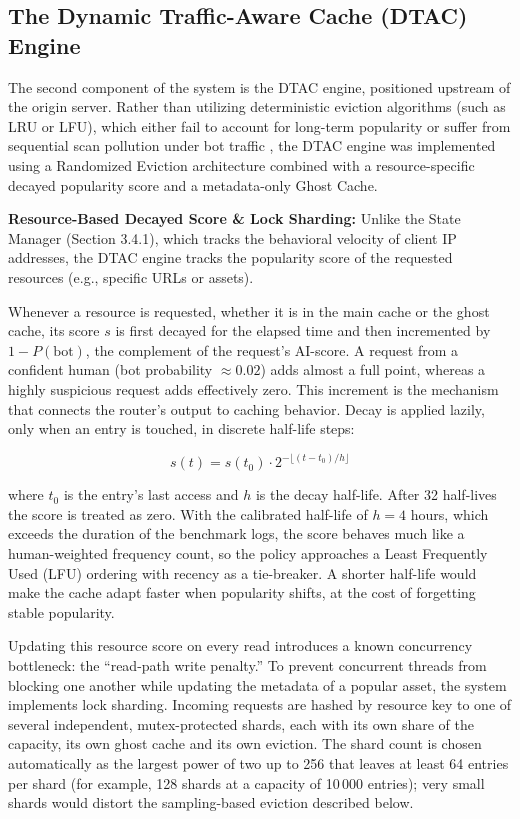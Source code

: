 \subsection{The Dynamic Traffic-Aware Cache (DTAC) Engine}
The second component of the system is the DTAC engine, positioned upstream of the origin server. Rather than utilizing deterministic eviction algorithms (such as LRU or LFU), which either fail to account for long-term popularity or suffer from sequential scan pollution under bot traffic \cite{zhang_rethinking_2026}, the DTAC engine was implemented using a Randomized Eviction architecture combined with a resource-specific decayed popularity score and a metadata-only Ghost Cache.

\textbf{Resource-Based Decayed Score \& Lock Sharding:}
Unlike the State Manager (Section 3.4.1), which tracks the behavioral velocity of client IP addresses, the DTAC engine tracks the popularity score of the requested resources (e.g., specific URLs or assets).

Whenever a resource is requested, whether it is in the main cache or the ghost cache, its score $s$ is first decayed for the elapsed time and then incremented by $1 - P(\text{bot})$, the complement of the request's AI-score. A request from a confident human (bot probability $\approx 0.02$) adds almost a full point, whereas a highly suspicious request adds effectively zero. This increment is the mechanism that connects the router's output to caching behavior. Decay is applied lazily, only when an entry is touched, in discrete half-life steps:

\begin{equation}
s(t) = s(t_0) \cdot 2^{-\lfloor (t - t_0) / h \rfloor}
\end{equation}

where $t_0$ is the entry's last access and $h$ is the decay half-life. After 32 half-lives the score is treated as zero. With the calibrated half-life of $h = 4$ hours, which exceeds the duration of the benchmark logs, the score behaves much like a human-weighted frequency count, so the policy approaches a Least Frequently Used (LFU) ordering with recency as a tie-breaker. A shorter half-life would make the cache adapt faster when popularity shifts, at the cost of forgetting stable popularity.

Updating this resource score on every read introduces a known concurrency bottleneck: the ``read-path write penalty.'' To prevent concurrent threads from blocking one another while updating the metadata of a popular asset, the system implements lock sharding. Incoming requests are hashed by resource key to one of several independent, mutex-protected shards, each with its own share of the capacity, its own ghost cache and its own eviction. The shard count is chosen automatically as the largest power of two up to 256 that leaves at least 64 entries per shard (for example, 128 shards at a capacity of 10\,000 entries); very small shards would distort the sampling-based eviction described below.

